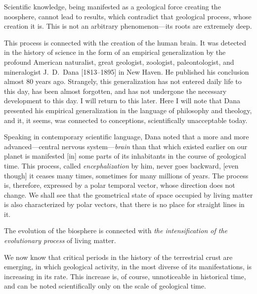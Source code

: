 Scientific knowledge, being manifested as a geological force creating the
noosphere, cannot lead to results, which contradict that geological process,
whose creation it is.  This is not an arbitrary phenomenon---its roots are
extremely deep.


\Section %
This process is connected with the creation of the human brain.  It was
detected in the history of science in the form of an empirical generalization
by the profound American naturalist, great geologist, zoologist,
paleontologist, and mineralogist J.~D.\ Dana [1813--1895] in New Haven.  He
published his conclusion almost 80 years ago.  Strangely, this generalization
has not entered daily life to this day, has been almost forgotten, and has not
undergone the necessary development to this day.  I will return to this later.
Here I will note that Dana presented his empirical generalization in the
language of philosophy and theology, and it, it seems, was connected to
conceptions, scientifically unacceptable today.

Speaking in contemporary scientific language, Dana noted that a more and more
advanced---central nervous system---\emph{brain} than that which existed
earlier on our planet is manifested [in] some parts of its inhabitants in the
course of geological time.\nocite{dana1866classification}  This process, called
\emph{encephalization} by him, never goes backward, [even though] it ceases
many times, sometimes for many millions of years.  The process is, therefore,
expressed by a polar temporal vector, whose direction does not change.  We
shall see that the geometrical state of space occupied by living matter is also characterized by
polar vectors, that there is no place for straight lines in it.

The evolution of the biosphere is connected with \emph{the intensification of
the evolutionary process} of living matter.

We now know that critical periods in the history of the terrestrial crust are
emerging, in which geological activity, in the most diverse of its
manifestations, is increasing in its rate.  This increase is, of course,
unnoticeable in historical time, and can be noted scientifically only on the
scale of geological time.

